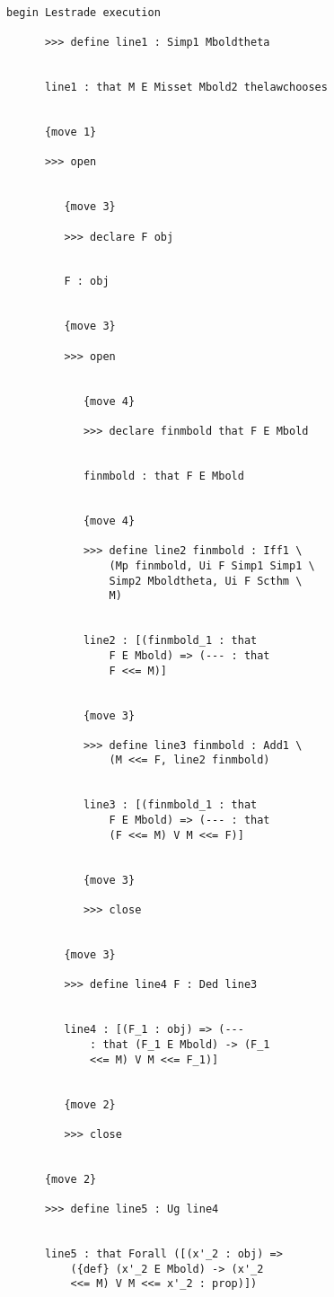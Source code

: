 \documentclass[12pt]{article}
\begin{document}
\begin{verbatim}

begin Lestrade execution

      >>> define line1 : Simp1 Mboldtheta


      line1 : that M E Misset Mbold2 thelawchooses


      {move 1}

      >>> open


         {move 3}

         >>> declare F obj


         F : obj


         {move 3}

         >>> open


            {move 4}

            >>> declare finmbold that F E Mbold


            finmbold : that F E Mbold


            {move 4}

            >>> define line2 finmbold : Iff1 \
                (Mp finmbold, Ui F Simp1 Simp1 \
                Simp2 Mboldtheta, Ui F Scthm \
                M)


            line2 : [(finmbold_1 : that 
                F E Mbold) => (--- : that 
                F <<= M)]


            {move 3}

            >>> define line3 finmbold : Add1 \
                (M <<= F, line2 finmbold)


            line3 : [(finmbold_1 : that 
                F E Mbold) => (--- : that 
                (F <<= M) V M <<= F)]


            {move 3}

            >>> close


         {move 3}

         >>> define line4 F : Ded line3


         line4 : [(F_1 : obj) => (--- 
             : that (F_1 E Mbold) -> (F_1 
             <<= M) V M <<= F_1)]


         {move 2}

         >>> close


      {move 2}

      >>> define line5 : Ug line4


      line5 : that Forall ([(x'_2 : obj) => 
          ({def} (x'_2 E Mbold) -> (x'_2 
          <<= M) V M <<= x'_2 : prop)])



\end{verbatim}
\end{document}
